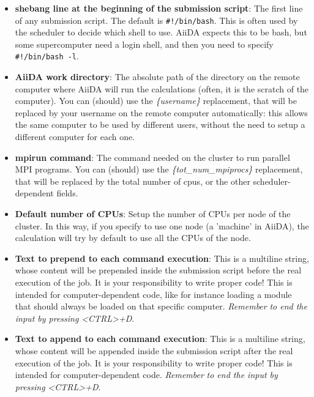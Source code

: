 \begin{appendices}
\begin{itemize}
\item {}
\textbf{shebang line at the beginning of the submission script}: 
The first line of any submission script. The default is \texttt{\#!/bin/bash}.
This is often used by the scheduler to decide which shell to use. AiiDA expects
this to be bash, but some supercomputer need a login shell, and then you need
to specify \texttt{\#!/bin/bash -l}.

\item {} 
\textbf{AiiDA work directory}: The absolute path of the directory on the
remote computer where AiiDA will run the calculations
(often, it is the scratch of the computer). You can (should) use the
\textit{\{username\}} replacement, that will be replaced by your username on the
remote computer automatically: this allows the same computer to be used
by different users, without the need to setup a different computer for
each one.

\item {} 
\textbf{mpirun command}: The  command needed on the cluster to run parallel MPI
programs. You can (should) use the \textit{\{tot\_num\_mpiprocs\}} replacement,
that will be replaced by the total number of cpus, or the other
scheduler-dependent fields. 

\item {}
\textbf{Default number of CPUs}: Setup the number of CPUs per node of the cluster. In this way, if you specify to use one node (a 'machine' in AiiDA), the calculation will try by default to use all the CPUs of the node.

\item {} 
\textbf{Text to prepend to each command execution}: This is a multiline string,
whose content will be prepended inside the submission script before the
real execution of the job. It is your responsibility to write proper  code!
This is intended for computer-dependent code, like for instance loading a
module that should always be loaded on that specific computer. \emph{Remember}
\emph{to end the input by pressing} \textit{\textless{}CTRL\textgreater{}+D}.

\item {} 
\textbf{Text to append to each command execution}: This is a multiline string,
whose content will be appended inside the submission script after the
real execution of the job. It is your responsibility to write proper  code!
This is intended for computer-dependent code. \emph{Remember}
\emph{to end the input by pressing} \textit{\textless{}CTRL\textgreater{}+D}.


\end{itemize}
\end{appendices}
